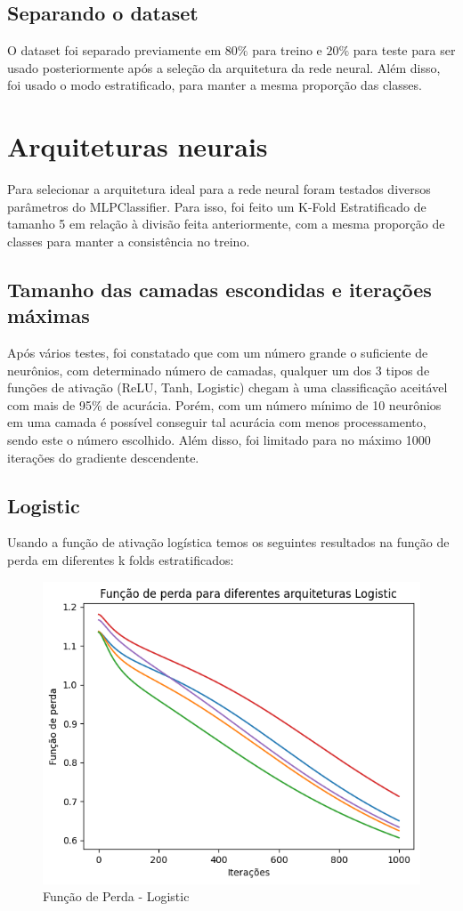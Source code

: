 \documentclass{article}
\begin{document}
\subsection{Separando o dataset}
O dataset foi separado previamente em $ 80\% $  para treino e $ 20\% $ para teste para ser usado posteriormente após a seleção da arquitetura da rede neural. Além disso, foi usado o modo estratificado, para manter a mesma proporção das classes.

\section{Arquiteturas neurais}

Para selecionar a arquitetura ideal para a rede neural foram testados diversos parâmetros do MLPClassifier. Para isso, foi feito um K-Fold Estratificado de tamanho 5 em relação à divisão feita anteriormente, com a mesma proporção de classes para manter a consistência no treino.

\subsection{Tamanho das camadas escondidas e iterações máximas}
Após vários testes, foi constatado que com um número grande o suficiente de neurônios, com determinado número de camadas, qualquer um dos 3 tipos de funções de ativação (ReLU, Tanh, Logistic) chegam à uma classificação aceitável com mais de 95\% de acurácia. Porém, com um número mínimo de 10 neurônios em uma camada é possível conseguir tal acurácia com menos processamento, sendo este o número escolhido. Além disso, foi limitado para no máximo 1000 iterações do gradiente descendente. 


\subsection{Logistic}

Usando a função de ativação logística temos os seguintes resultados na função de perda em diferentes k folds estratificados:

\begin{figure}[ht!]
    \centering
    \includegraphics[width=0.5\linewidth]{logistic_loss.png}
    \caption{Função de Perda - Logistic}
    \label{fig:enter-label}
\end{figure}
\end{document}
